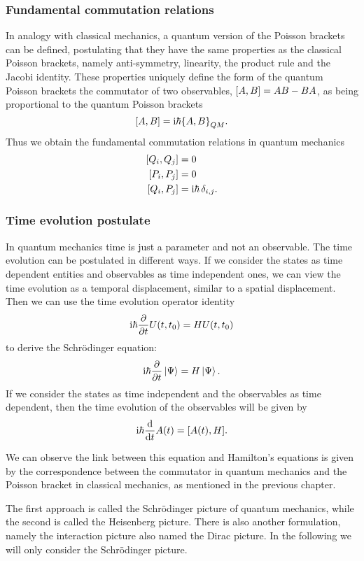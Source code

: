 \documentclass[../thesis.tex]{subfiles}
\theoremstyle{definition}
\begin{document}

\subsubsection{Fundamental commutation relations}

In analogy with classical mechanics, a quantum version of the Poisson
brackets can be defined, postulating that they have the same properties
as the classical Poisson brackets, namely anti-symmetry, linearity, the product
rule and the Jacobi identity. These properties uniquely define the form
of the quantum Poisson brackets the commutator of two observables,
\(\comm{A}{B} = AB - BA\), as being proportional to the quantum Poisson brackets
\[
  \comm{A}{B} = \ii \hbar {\{A,B\}}_{QM}.
\]
Thus we obtain the fundamental commutation relations in quantum mechanics
\begin{align*}
  \comm{Q_i}{Q_j} &= 0 \\
  \comm{P_i}{P_j} &= 0 \\
  \comm{Q_i}{P_j} &= \ii \hbar \,\delta_{i,j}.
\end{align*}

\subsubsection{Time evolution postulate}

In quantum mechanics time is just a parameter and not an observable.
The time evolution can be postulated in different ways.
If we consider the states as time dependent entities and observables as time
independent ones, we can view the time
evolution as a temporal displacement, similar to a spatial displacement.
Then we can use the time evolution operator identity
\[
  \mathrm{i} \hbar \pdv{t} U(t,t_0) = H U(t,t_0)
\]
to derive the Schrödinger equation:
\[
  \mathrm{i} \hbar \pdv{t} \ket{\Psi} = H \ket{\Psi}.
\]
If we consider the states as time independent and the observables as time dependent,
then the time evolution of the observables will be given by
\[
  \mathrm{i} \hbar \dv{t} A(t) = [A(t), H].
\]

We can observe the link between this equation and Hamilton's equations is given
by the correspondence between the commutator in quantum mechanics and the Poisson
bracket in classical mechanics, as mentioned in the previous chapter.

The first approach is called the Schrödinger picture of quantum mechanics, while
the second is called the Heisenberg picture. There is also another formulation,
namely the interaction picture also named the Dirac picture.
In the following we will only consider the Schrödinger picture.
\end{document}

